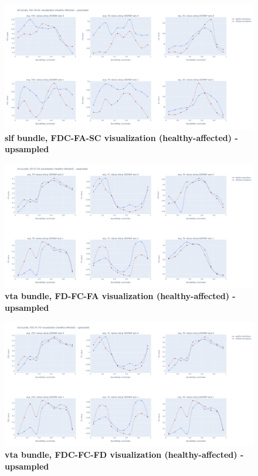 \documentclass[thesis.tex]{subfiles}
\begin{document}
\begin{figure}
  \centering
  \includegraphics[width=24cm]{thesis_radomskyi/apendix/slf bundle, FDC-FA-SC visualization (healthy-affected) - upsampled.png}
    \caption{\textbf{slf bundle, FDC-FA-SC visualization (healthy-affected) - upsampled}}
\end{figure}

\begin{figure}
  \centering
  \includegraphics[width=24cm]{thesis_radomskyi/apendix/vta bundle, FD-FC-FA visualization (healthy-affected) - upsampled.png}
    \caption{\textbf{vta bundle, FD-FC-FA visualization (healthy-affected) - upsampled}}
\end{figure}

\begin{figure}
  \centering
  \includegraphics[width=24cm]{thesis_radomskyi/apendix/vta bundle, FDC-FC-FD visualization (healthy-affected) - upsampled.png}
    \caption{\textbf{vta bundle, FDC-FC-FD visualization (healthy-affected) - upsampled}}
\end{figure}
\end{document}

